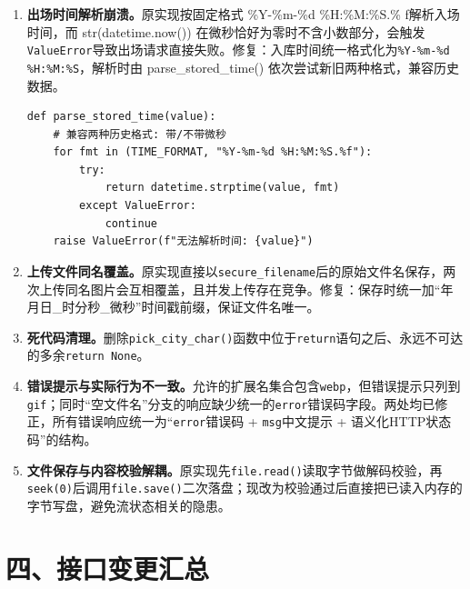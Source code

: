 \documentclass[12pt,a4paper]{article}
\begin{document}
\begin{enumerate}
  \item \textbf{出场时间解析崩溃。}原实现按固定格式 \%Y-\%m-\%d \%H:\%M:\%S.\% f解析入场时间，而 str(datetime.now()) 在微秒恰好为零时不含小数部分，会触发\texttt{ValueError}导致出场请求直接失败。修复：入库时间统一格式化为\texttt{\%Y-\%m-\%d \%H:\%M:\%S}，解析时由 parse\_stored\_time() 依次尝试新旧两种格式，兼容历史数据。

\begin{lstlisting}
def parse_stored_time(value):
    # 兼容两种历史格式: 带/不带微秒
    for fmt in (TIME_FORMAT, "%Y-%m-%d %H:%M:%S.%f"):
        try:
            return datetime.strptime(value, fmt)
        except ValueError:
            continue
    raise ValueError(f"无法解析时间: {value}")
\end{lstlisting}

  \item \textbf{上传文件同名覆盖。}原实现直接以\texttt{secure\_filename}后的原始文件名保存，两次上传同名图片会互相覆盖，且并发上传存在竞争。修复：保存时统一加“年月日\_时分秒\_微秒”时间戳前缀，保证文件名唯一。
  \item \textbf{死代码清理。}删除\texttt{pick\_city\_char()}函数中位于\texttt{return}语句之后、永远不可达的多余\texttt{return None}。
  \item \textbf{错误提示与实际行为不一致。}允许的扩展名集合包含\texttt{webp}，但错误提示只列到\texttt{gif}；同时“空文件名”分支的响应缺少统一的\texttt{error}错误码字段。两处均已修正，所有错误响应统一为“\texttt{error}错误码 + \texttt{msg}中文提示 + 语义化HTTP状态码”的结构。
  \item \textbf{文件保存与内容校验解耦。}原实现先\texttt{file.read()}读取字节做解码校验，再\texttt{seek(0)}后调用\texttt{file.save()}二次落盘；现改为校验通过后直接把已读入内存的字节写盘，避免流状态相关的隐患。
\end{enumerate}

\section*{四、接口变更汇总}
\end{document}
